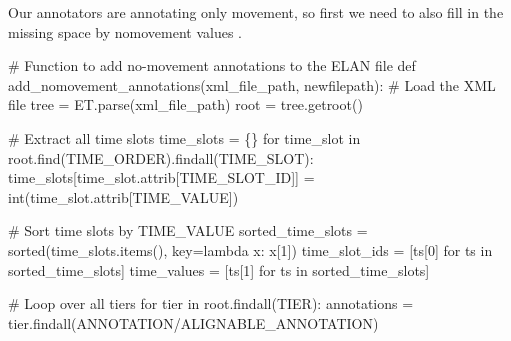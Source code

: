 \documentclass[
  letterpaper,
  DIV=11,
  numbers=noendperiod]{scrreprt}
\newenvironment{Shaded}{\begin{snugshade}}{\end{snugshade}}
\newcommand{\BuiltInTok}[1]{\textcolor[rgb]{0.00,0.23,0.31}{#1}}
\newcommand{\CommentTok}[1]{\textcolor[rgb]{0.37,0.37,0.37}{#1}}
\newcommand{\ControlFlowTok}[1]{\textcolor[rgb]{0.00,0.23,0.31}{#1}}
\newcommand{\DecValTok}[1]{\textcolor[rgb]{0.68,0.00,0.00}{#1}}
\newcommand{\KeywordTok}[1]{\textcolor[rgb]{0.00,0.23,0.31}{#1}}
\newcommand{\NormalTok}[1]{\textcolor[rgb]{0.00,0.23,0.31}{#1}}
\newcommand{\OperatorTok}[1]{\textcolor[rgb]{0.37,0.37,0.37}{#1}}
\newcommand{\StringTok}[1]{\textcolor[rgb]{0.13,0.47,0.30}{#1}}
\begin{document}
Our annotators are annotating only movement, so first we need to also
fill in the missing space by nomovement values .

\begin{Shaded}
\begin{Highlighting}[]
\CommentTok{\# Function to add no{-}movement annotations to the ELAN file}
\KeywordTok{def}\NormalTok{ add\_nomovement\_annotations(xml\_file\_path, newfilepath):}
    \CommentTok{\# Load the XML file}
\NormalTok{    tree }\OperatorTok{=}\NormalTok{ ET.parse(xml\_file\_path)}
\NormalTok{    root }\OperatorTok{=}\NormalTok{ tree.getroot()}

    \CommentTok{\# Extract all time slots}
\NormalTok{    time\_slots }\OperatorTok{=}\NormalTok{ \{\}}
    \ControlFlowTok{for}\NormalTok{ time\_slot }\KeywordTok{in}\NormalTok{ root.find(}\StringTok{\textquotesingle{}TIME\_ORDER\textquotesingle{}}\NormalTok{).findall(}\StringTok{\textquotesingle{}TIME\_SLOT\textquotesingle{}}\NormalTok{):}
\NormalTok{        time\_slots[time\_slot.attrib[}\StringTok{\textquotesingle{}TIME\_SLOT\_ID\textquotesingle{}}\NormalTok{]] }\OperatorTok{=} \BuiltInTok{int}\NormalTok{(time\_slot.attrib[}\StringTok{\textquotesingle{}TIME\_VALUE\textquotesingle{}}\NormalTok{])}

    \CommentTok{\# Sort time slots by TIME\_VALUE}
\NormalTok{    sorted\_time\_slots }\OperatorTok{=} \BuiltInTok{sorted}\NormalTok{(time\_slots.items(), key}\OperatorTok{=}\KeywordTok{lambda}\NormalTok{ x: x[}\DecValTok{1}\NormalTok{])}
\NormalTok{    time\_slot\_ids }\OperatorTok{=}\NormalTok{ [ts[}\DecValTok{0}\NormalTok{] }\ControlFlowTok{for}\NormalTok{ ts }\KeywordTok{in}\NormalTok{ sorted\_time\_slots]}
\NormalTok{    time\_values }\OperatorTok{=}\NormalTok{ [ts[}\DecValTok{1}\NormalTok{] }\ControlFlowTok{for}\NormalTok{ ts }\KeywordTok{in}\NormalTok{ sorted\_time\_slots]}

    \CommentTok{\# Loop over all tiers}
    \ControlFlowTok{for}\NormalTok{ tier }\KeywordTok{in}\NormalTok{ root.findall(}\StringTok{\textquotesingle{}TIER\textquotesingle{}}\NormalTok{):}
\NormalTok{        annotations }\OperatorTok{=}\NormalTok{ tier.findall(}\StringTok{\textquotesingle{}ANNOTATION/ALIGNABLE\_ANNOTATION\textquotesingle{}}\NormalTok{)}


\end{Highlighting}
\end{Shaded}
\end{document}
